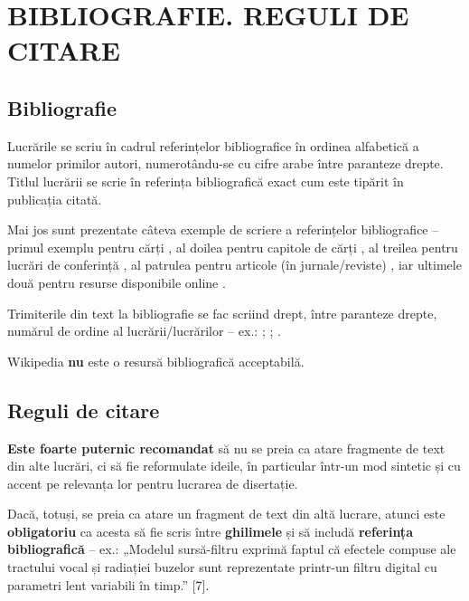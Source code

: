 \chapter{BIBLIOGRAFIE. REGULI DE CITARE}

\section{Bibliografie}

Lucrările se scriu în cadrul referințelor bibliografice în ordinea alfabetică a numelor primilor autori, numerotându-se cu cifre arabe între paranteze drepte. Titlul lucrării se scrie în referința bibliografică exact cum este tipărit în publicația citată.

Mai jos sunt prezentate câteva exemple de scriere a referințelor bibliografice – primul exemplu pentru cărți \cite{Burileanu2022}, al doilea pentru capitole de cărți \cite{Kao2020}, al treilea pentru lucrări de conferință \cite{Zhang2021}, al patrulea pentru articole (în jurnale/reviste) \cite{Yi2022}, iar ultimele două pentru resurse disponibile online \cite{Zeiler2012,MATLAB2025}.

Trimiterile din text la bibliografie se fac scriind drept, între paranteze drepte, numărul de ordine al lucrării/lucrărilor – ex.: \cite{Burileanu2022}; \cite{Kao2020,Zeiler2012}; \cite{Zhang2021,Yi2022,Zeiler2012,MATLAB2025}.

\printbibliography[heading=none]

Wikipedia \textbf{nu} este o resursă bibliografică acceptabilă.

\newpage


\section{Reguli de citare}

\textbf{Este foarte puternic recomandat} să nu se preia ca atare fragmente de text din alte lucrări, ci să fie reformulate ideile, în particular într-un mod sintetic și cu accent pe relevanța lor pentru lucrarea de disertație.

Dacă, totuși, se preia ca atare un fragment de text din altă lucrare, atunci este \textbf{obligatoriu} ca acesta să fie scris între \textbf{ghilimele} și să includă \textbf{referința bibliografică} – ex.: „Modelul sursă-filtru exprimă faptul că efectele compuse ale tractului vocal și radiației buzelor sunt reprezentate printr-un filtru digital cu parametri lent variabili în timp.” [7].\\

